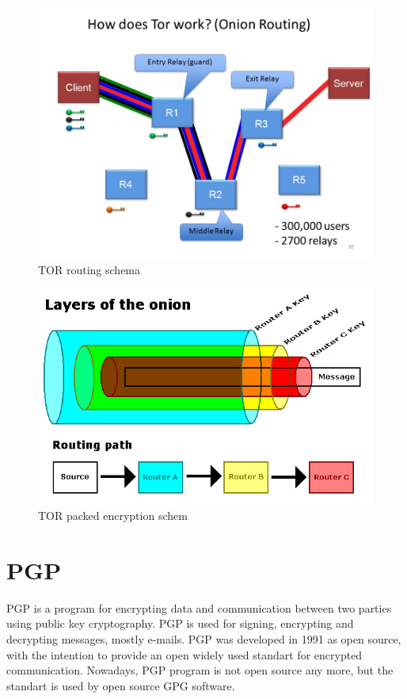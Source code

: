 \documentclass[
  digital, %
  table,   %
  lof,     %
  lot,     %
  oneside
]{fithesis3}
\begin{document}
 \begin{figure}[!htb]
    \centering
    \includegraphics[width=1\textwidth]{tor-prejate}
    \caption{TOR routing schema}
    \label{TOR routing schema}
\end{figure}
 
  \begin{figure}[!htb]
    \centering
    \includegraphics[width=1\textwidth]{tor-packet-prejate}
    \caption{TOR packed encryption schem}
    \label{TOR packed encryption schema}
\end{figure}
 
\section{PGP}

PGP \parencite{Zimmermann:1995:OPU:202735} is a program for encrypting data
and communication between two parties using public key cryptography.
PGP is used for signing, encrypting and decrypting messages, mostly e-mails.
PGP was developed in 1991 as open source, with the intention 
to provide an open widely used standart for encrypted communication.
Nowadays, PGP program is not open source any more, but the standart is used by open source GPG software.
\end{document}
